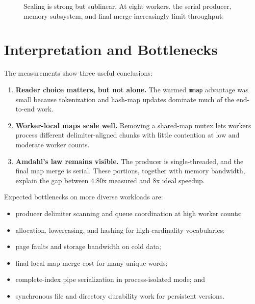 \documentclass[11pt]{article}
\begin{document}
\begin{figure}[ht]
\centering
{}
\caption{Scaling is strong but sublinear. At eight workers, the serial producer,
memory subsystem, and final merge increasingly limit throughput.}
\end{figure}
\FloatBarrier
\section{Interpretation and Bottlenecks}

The measurements show three useful conclusions:

\begin{enumerate}
  \item \textbf{Reader choice matters, but not alone.} The warmed \texttt{mmap}
        advantage was small because tokenization and hash-map updates dominate
        much of the end-to-end work.
  \item \textbf{Worker-local maps scale well.} Removing a shared-map mutex lets
        workers process different delimiter-aligned chunks with little
        contention at low and moderate worker counts.
  \item \textbf{Amdahl's law remains visible.} The producer is single-threaded,
        and the final map merge is serial. These portions, together with memory
        bandwidth, explain the gap between 4.80x measured and 8x ideal speedup.
\end{enumerate}

Expected bottlenecks on more diverse workloads are:

\begin{itemize}[noitemsep]
  \item producer delimiter scanning and queue coordination at high worker counts;
  \item allocation, lowercasing, and hashing for high-cardinality vocabularies;
  \item page faults and storage bandwidth on cold data;
  \item final local-map merge cost for many unique words;
  \item complete-index pipe serialization in process-isolated mode; and
  \item synchronous file and directory durability work for persistent versions.
\end{itemize}
\end{document}
